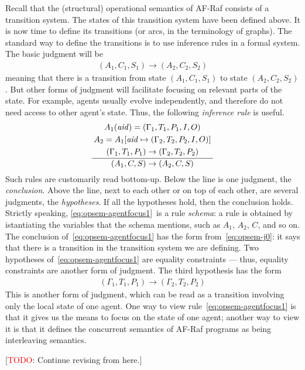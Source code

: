 \documentclass[a4paper,12pt,oneside,fleqn]{book} %
\newcommand{\on}[2]{\genfrac{}{}{0pt}{0}{\strut#1}{\strut#2}}
\newcommand{\todo}[1]{[\textcolor{red}{TODO}: #1]}
\begin{document}
Recall that the (structural) operational semantics of AF-Raf consists of a
transition system. The states of this transition system have been defined
above. It is now time to define its transitions (or arcs, in the
terminology of graphs). The standard way to define the transitions is to
use inference rules in a formal system. The basic judgment will be
\begin{align}
(A_1,C_1,S_1) \to (A_2, C_2,S_2)
\label{eq:opsem-j0}
\end{align}
meaning that there is a transition from state $(A_1,C_1,S_1)$ to state
$(A_2,C_2,S_2)$. But other forms of judgment will facilitate focusing on
relevant parts of the state. For example, agents usually evolve
independently, and therefore do not need access to other agent's state.
Thus, the following \emph{inference rule} is useful.
\begin{align}
\frac
  {\on{A_1({\it aid})=(\Gamma_1,T_1,P_1,I,O)}
  {\on{A_2=A_1[{\it aid}\mapsto(\Gamma_2,T_2,P_2,I,O)]}
  {(\Gamma_1,T_1,P_1)\to(\Gamma_2,T_2,P_2)}}}
  {(A_1,C,S)\to(A_2,C,S)}
\label{eq:opsem-agentfocus1}
\end{align}
Such rules are customarily read bottom-up. Below the line is one judgment,
the \emph{conclusion}. Above the line, next to each other or on top of each
other, are several judgments, the \emph{hypotheses}. If all the hypotheses
hold, then the conclusion holds. Strictly speaking,
\eqref{eq:opsem-agentfocus1}~is a rule \emph{schema}: a rule is obtained by
istantiating the variables that the schema mentions, such as $A_1$, $A_2$,
$C$, and so on. The conclusion of~\eqref{eq:opsem-agentfocus1} has the form
from~\eqref{eq:opsem-j0}: it says that there is a transition in the
transition system we are defining. Two hypotheses
of~\eqref{eq:opsem-agentfocus1} are equality constraints --- thus, equality
constraints are another form of judgment. The third hypothesis has the form
\begin{align}
(\Gamma_1,T_1,P_1)\to(\Gamma_2,T_2,P_2)
\end{align}
This is another form of judgment, which can be read as a transition
involving only the local state of one agent. One way to view
rule~\eqref{eq:opsem-agentfocus1} is that it gives us the means to focus on
the state of one agent; another way to view it is that it defines the
concurrent semantics of AF-Raf programs as being interleaving semantics.


\todo{Continue revising from here.}
\end{document}
